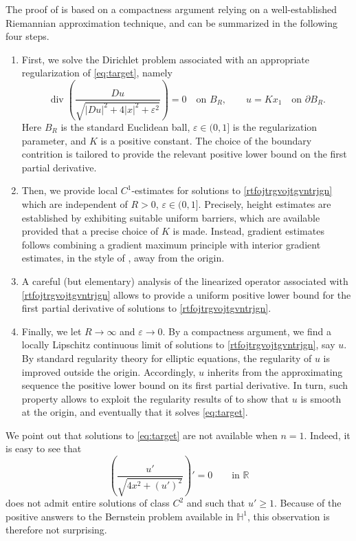 \documentclass[11pt]{amsart}
\renewcommand{\geq}{\geqslant}
\renewcommand{\ge}{>}
\newcommand{\rr}{{\mathbb{R}}}
\newcommand{\hh}{{\mathbb{H}}}
\newcommand{\eps}{\varepsilon}
\DeclareMathOperator{\divv}{div}
\theoremstyle{definition}
\theoremstyle{remark}
\numberwithin{equation}{section}
\begin{document}
\medskip
The proof of  is based on a compactness argument relying on a well-established Riemannian approximation technique, and can be summarized in the following four steps.
\begin{enumerate}
    \item First, we solve the Dirichlet problem associated with an appropriate regularization of \eqref{eq:target}, namely
\begin{equation}\label{rtfojtrgvojtgvntrjgn}
 \divv\left(\frac{Du}{\sqrt{|Du|^2+4|x|^2+\eps^2}}\right)=0\quad\text{on }B_R,
 \qquad u=Kx_1\quad\text{on }\partial B_R.
\end{equation}
Here $B_R$ is the standard Euclidean ball, $\eps\in(0,1]$ is the regularization parameter, and $K$ is a positive constant. The choice of the boundary contrition is tailored to provide the relevant positive lower bound on the first partial derivative.
\item Then, we provide local $C^1$-estimates for solutions to \eqref{rtfojtrgvojtgvntrjgn} which are independent of $R\ge 0$, $\eps\in(0,1]$. Precisely, height estimates are established by exhibiting suitable uniform barriers,  which are available provided that a precise choice of $K$ is made. Instead, gradient estimates follows combining a gradient maximum principle with interior gradient estimates, in the style of \cite{MR5029815}, away from the origin. 
\item A careful (but elementary) analysis of the linearized operator associated with \eqref{rtfojtrgvojtgvntrjgn} allows to provide a uniform positive lower bound for the first partial derivative of solutions to \eqref{rtfojtrgvojtgvntrjgn}.
\item Finally, we let $R\to\infty$ and $\eps\to 0$. By a compactness argument, we find a locally Lipschitz continuous limit of solutions to \eqref{rtfojtrgvojtgvntrjgn}, say $u$. By standard regularity theory for elliptic equations, the regularity of $u$ is improved outside the origin. Accordingly, $u$ inherits from the approximating sequence the positive lower bound on its first partial derivative. In turn, such property allows to exploit the regularity results of \cite{MR2774306} to show that $u$ is smooth at the origin, and eventually that it solves \eqref{eq:target}.
\end{enumerate}
We point out that solutions to \eqref{eq:target} are not available when $n=1$. Indeed, it is easy to see that 
 \[
    \left(\frac{u'}{\sqrt{4x^2+(u')^2}}\right)'=0\qquad \text{in }\rr
    \]
   does not admit entire solutions of class $C^2$ and such that $u'\geq 1$. Because of the positive answers to the Bernstein problem available in $\hh^1$, this observation is therefore not surprising. 
\end{document}

